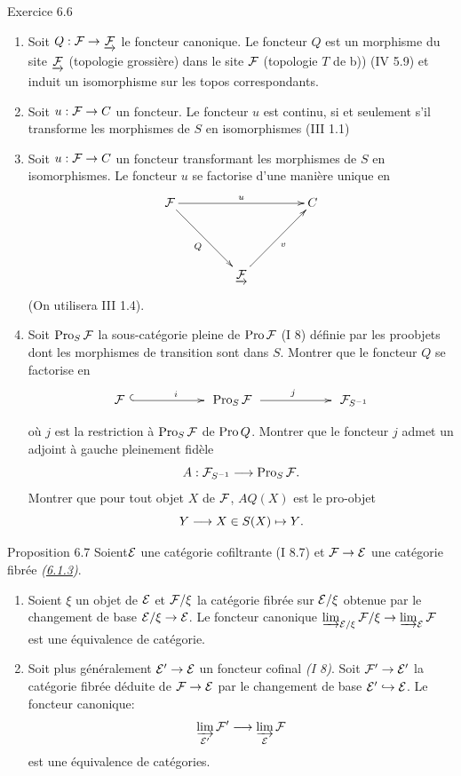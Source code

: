 \documentclass[10pt]{../fichiers-configuration-latex/smfart}
\begin{document}
\begin{enonce*}[remark]{Exercice 6.6}
\begin{enumerate}
\item Soit $Q : \Ff \to \underrightarrow{\Ff}$ le foncteur
  canonique. Le foncteur $Q$ est un morphisme du site
  $\underrightarrow{{\mathcal F}}$ (topologie grossière) dans le site
  ${\mathcal F}$ (topologie $T$ de b)) (IV 5.9) et induit un
  isomorphisme sur les topos correspondants.

\item Soit $u : \Ff \to C$ un foncteur. Le foncteur $u$ est
  continu, si et seulement s'il transforme les morphismes de $S$ en
  isomorphismes (III 1.1)

\item Soit $u : \Ff \to C$ un foncteur transformant les
  morphismes de $S$ en isomorphismes. Le foncteur $u$ se factorise
  d'une manière unique en
\[
\xymatrix@=1.5cm{
  \Ff\ar[rr]^{u} \ar[rd]_{Q}&  & C\\
            & \underrightarrow{\Ff}{} \ar[ru]_{v}&
}
\]
(On utilisera III 1.4).

\item Soit $\operatorname{Pro}_S {\mathcal F}$ la sous-catégorie pleine de
  $\operatorname{Pro} {\mathcal F}$ (I 8) définie par les proobjets dont les
  morphismes de transition sont dans $S$. Montrer que le foncteur $Q$
  se factorise en
\[
\xymatrix@M=.25cm@C=2cm{
\Ff\ar@{^{(}->}[r]^{i}& \Pro_S\Ff\ar[r]^{j}&
\Ff_{S^{-1}}
}
\]
où $j$ est la restriction à $\operatorname{Pro}_S {\mathcal F}$ de $\operatorname{Pro} Q$. Montrer que le
foncteur $j$ admet un  adjoint à gauche pleinement fidèle
$$
A : \Ff_{S^{-1}} \to \Pro_S \Ff{\quoi}.
$$
Montrer que pour tout objet $X$ de ${\mathcal F}$, $AQ(X)$ est le
pro-objet
$$
Y \to X \in S(X) \mapsto Y{\quoi}.
$$
\end{enumerate}
\end{enonce*}

\begin{enonce*}{Proposition 6.7}
Soient\pageoriginale ${\mathcal E}$ une catégorie cofiltrante (I 8.7)
et $\Ff \to \Ee$ une catégorie fibrée \emph{(\hyperref[VI.subsubsec6.1.3]{6.1.3})}.
\begin{enumerate}
\renewcommand{\labelenumi}{\theenumi)}
\item Soient $\xi$ un objet de ${\mathcal E}$ et ${\mathcal F}/\xi$ la
  catégorie fibrée sur ${\mathcal E}/\xi$ obtenue par le changement de
  base $\Ee/\xi \to \Ee$. Le foncteur canonique
  $\varinjlim_{\Ee/\xi} \Ff /
  \xi \to \varinjlim_{\Ee}
  \Ff $ est une équivalence de catégorie.

\item Soit plus généralement $\Ee' \to \Ee$ un
  foncteur cofinal \emph{(I 8)}. Soit $\Ff'\to \Ee'$ la
  catégorie fibrée déduite de $\Ff \to \Ee$ par le
  changement de base ${\mathcal E}'\hookrightarrow {\mathcal E}$. Le foncteur
  canonique:
$$
\varinjlim_{\Ee'} \Ff' \to \varinjlim_{\Ee} \Ff
$$
est une équivalence de catégories.
\end{enumerate}
\end{enonce*}
\end{document}

